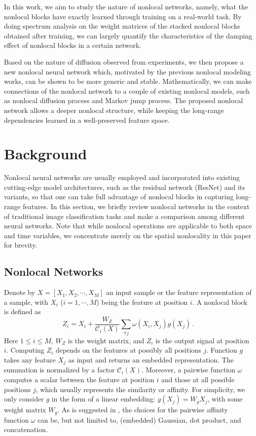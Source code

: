 \documentclass{article}
\begin{document}
In this work, we aim to study the nature of nonlocal networks, namely, what the nonlocal blocks have exactly learned through training on a real-world task. By doing spectrum analysis on the weight matrices of the stacked nonlocal blocks obtained after training, we can largely quantify the characteristics of the damping effect of nonlocal blocks in a certain network.

Based on the nature of diffusion observed from experiments, we then propose a new nonlocal neural network which, motivated by the previous nonlocal modeling works, can be shown to be more generic and stable. Mathematically, we can make connections of the nonlocal network to a couple of existing nonlocal models, such as nonlocal diffusion process and Markov jump process. The proposed nonlocal network allows a deeper nonlocal structure, while keeping the long-range dependencies learned in a well-preserved feature space.




\section{Background}\label{sec:bg}
Nonlocal neural networks are usually employed and incorporated into existing cutting-edge model architectures, such as the residual network (ResNet) and its variants, so that one can take full advantage of nonlocal blocks in capturing long-range features. In this section, we briefly review nonlocal networks in the context of traditional image classification tasks and make a comparison among different neural networks. Note that while nonlocal operations are applicable to both space and time variables, we concentrate merely on the spatial nonlocality in this paper for brevity.

\subsection{Nonlocal Networks}
Denote by $X=[X_1, X_2, \cdots, X_M]$ an input sample or the feature representation of a sample, with $X_i$ ($i=1,\cdots,M$) being the feature at position $i$. A nonlocal block \cite{wang2017non} is defined as
\begin{equation}\label{nl-bl-old}
Z_i = X_i + \frac{W_{Z}}{\mathcal{C}_i(X)} \sum_{\forall j} \omega(X_i,X_j)g(X_j)\,.
\end{equation}
Here $1\le i\le M$, $W_Z$ is the weight matrix, and $Z_i$ is the output signal at position $i$. Computing $Z_i$ depends on the features at possibly all positions $j$. Function $g$ takes any feature $X_j$ as input and returns an embedded representation. The summation is normalized by a factor $\mathcal{C}_i(X)$. Moreover, a pairwise function $\omega$ computes a scalar between the feature at position $i$ and those at all possible positions $j$, which usually represents the similarity or affinity. For simplicity, we only consider $g$ in the form of a linear embedding: $g(X_j)=W_g X_j$, with some weight matrix $W_g$. As is suggested in \cite{wang2017non}, the choices for the pairwise affinity function $\omega$ can be, but not limited to, (embedded) Gaussian, dot product, and concatenation.
\end{document}
